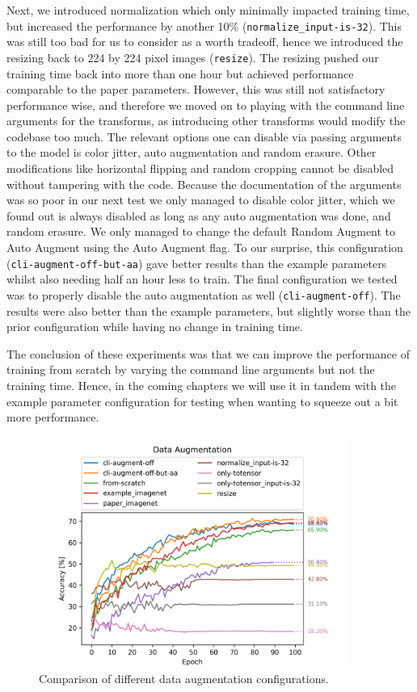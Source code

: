 \documentclass{article}
\begin{document}
    Next, we introduced normalization which only minimally impacted training time, but increased the performance by another 10\% (\texttt{normalize\_input-is-32}).
    This was still too bad for us to consider as a worth tradeoff, hence we introduced the resizing back to 224 by 224 pixel images (\texttt{resize}).
    The resizing pushed our training time back into more than one hour but achieved performance comparable to the paper parameters.
    However, this was still not satisfactory performance wise, and therefore we moved on to playing with the command line arguments for the transforms, as introducing other transforms would modify the codebase too much.
    The relevant options one can disable via passing arguments to the model is color jitter, auto augmentation and random erasure.
    Other modifications like horizontal flipping and random cropping cannot be disabled without tampering with the code.
    Because the documentation of the arguments was so poor in our next test we only managed to disable color jitter, which we found out is always disabled as long as any auto augmentation was done, and random erasure.
    We only managed to change the default Random Augment to Auto Augment using the Auto Augment flag.
    To our surprise, this configuration (\texttt{cli-augment-off-but-aa}) gave better results than the example parameters whilst also needing half an hour less to train.
    The final configuration we tested was to properly disable the auto augmentation as well (\texttt{cli-augment-off}).
    The results were also better than the example parameters, but slightly worse than the prior configuration while having no change in training time.

    The conclusion of these experiments was that we can improve the performance of training from scratch by varying the command line arguments but not the training time.
    Hence, in the coming chapters we will use it in tandem with the example parameter configuration for testing when wanting to squeeze out a bit more performance.
    \begin{figure}[h]
        \centering
        \includegraphics[width=0.9\textwidth]{images/data_augmentation}
        \caption{Comparison of different data augmentation configurations.}
        \label{fig:data-augmentation}
    \end{figure}
\end{document}
